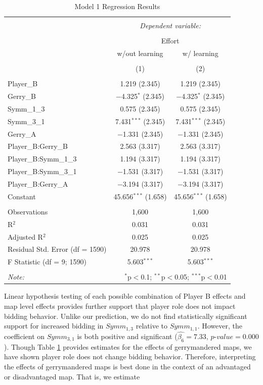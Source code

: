 \documentclass[AER]{AEA}
\begin{document}
\begin{table}[!htbp] \centering 
  \caption{Model 1 Regression Results} 
  \label{Tab:regression_1} 
\begin{tabular}{@{\extracolsep{5pt}}lcc} 
\\[-1.8ex]\hline 
\hline \\[-1.8ex] 
 & \multicolumn{2}{c}{\textit{Dependent variable:}} \\ 
\cline{2-3} 
\\[-1.8ex] & \multicolumn{2}{c}{Effort} \\ 
 & w/out learning & w/ learning \\ 
\\[-1.8ex] & (1) & (2)\\ 
\hline \\[-1.8ex] 
 Player\_B & 1.219 (2.345) & 1.219 (2.345) \\ 
  Gerry\_B & $-$4.325$^{*}$ (2.345) & $-$4.325$^{*}$ (2.345) \\ 
  Symm\_1\_3 & 0.575 (2.345) & 0.575 (2.345) \\ 
  Symm\_3\_1 & 7.431$^{***}$ (2.345) & 7.431$^{***}$ (2.345) \\ 
  Gerry\_A & $-$1.331 (2.345) & $-$1.331 (2.345) \\ 
  Player\_B:Gerry\_B & 2.563 (3.317) & 2.563 (3.317) \\ 
  Player\_B:Symm\_1\_3 & 1.194 (3.317) & 1.194 (3.317) \\ 
  Player\_B:Symm\_3\_1 & $-$1.531 (3.317) & $-$1.531 (3.317) \\ 
  Player\_B:Gerry\_A & $-$3.194 (3.317) & $-$3.194 (3.317) \\ 
  Constant & 45.656$^{***}$ (1.658) & 45.656$^{***}$ (1.658) \\ 
 \hline \\[-1.8ex] 
Observations & 1,600 & 1,600 \\ 
R$^{2}$ & 0.031 & 0.031 \\ 
Adjusted R$^{2}$ & 0.025 & 0.025 \\ 
Residual Std. Error (df = 1590) & 20.978 & 20.978 \\ 
F Statistic (df = 9; 1590) & 5.603$^{***}$ & 5.603$^{***}$ \\ 
\hline 
\hline \\[-1.8ex] 
\textit{Note:}  & \multicolumn{2}{r}{$^{*}$p$<$0.1; $^{**}$p$<$0.05; $^{***}$p$<$0.01} \\ 
\end{tabular} 
\end{table} 
Linear hypothesis testing of each possible combination of Player B effects and map level effects provides further support that player role does not impact bidding behavior. Unlike our prediction, we do not find statistically significant support for increased bidding in $Symm_{1,3}$ relative to $Symm_{1,1}$. However, the coefficient on $Symm_{3,1}$ is both positive and significant ($\hat{\beta_6} = 7.33$, $\mathit{p\mbox{-}value} = 0.000$). Though Table \ref{Tab:regression_1} provides estimates for the effects of gerrymandered maps, we have shown player role does not change bidding behavior. Therefore, interpreting the effects of gerrymandered maps is best done in the context of an advantaged or disadvantaged map. That is, we estimate
\end{document}
